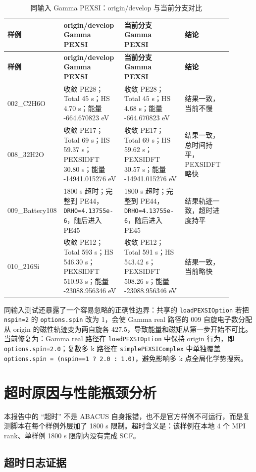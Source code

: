 \documentclass[a4paper,11pt]{article}
\newcommand{\code}[1]{\texttt{#1}}
\begin{document}
{\scriptsize
\begin{longtable}{@{}p{0.15\linewidth}p{0.27\linewidth}p{0.27\linewidth}p{0.21\linewidth}@{}}
\caption{同输入 Gamma PEXSI：origin/develop 与当前分支对比}
\label{tab:gamma-same-input-compare}\\
\toprule
\textbf{样例} & \textbf{origin/develop Gamma PEXSI} & \textbf{当前分支 Gamma PEXSI} & \textbf{结论}\\
\midrule
\endfirsthead
\toprule
\textbf{样例} & \textbf{origin/develop Gamma PEXSI} & \textbf{当前分支 Gamma PEXSI} & \textbf{结论}\\
\midrule
\endhead
002\_C2H6O & 收敛 PE28；Total 45 s；HS 4.70 s；能量 -664.670823 eV & 收敛 PE28；Total 45 s；HS 4.68 s；能量 -664.670823 eV & 结果一致，当前不慢\\
008\_32H2O & 收敛 PE17；Total 69 s；HS 59.37 s；PEXSIDFT 30.80 s；能量 -14941.015276 eV & 收敛 PE17；Total 69 s；HS 59.62 s；PEXSIDFT 30.57 s；能量 -14941.015276 eV & 结果一致，总时间持平，PEXSIDFT 略快\\
009\_Battery108 & 1800 s 超时；完整到 PE44，\code{DRHO=4.13755e-6}，随后进入 PE45 & 1800 s 超时；完整到 PE44，\code{DRHO=4.13755e-6}，随后进入 PE45 & 结果轨迹一致，超时进度持平\\
010\_216Si & 收敛 PE12；Total 593 s；HS 546.30 s；PEXSIDFT 510.93 s；能量 -23088.956346 eV & 收敛 PE12；Total 591 s；HS 543.42 s；PEXSIDFT 508.26 s；能量 -23088.956346 eV & 结果一致，当前略快\\
\bottomrule
\end{longtable}
}

同输入测试还暴露了一个容易忽略的正确性边界：共享的 \code{loadPEXSIOption} 若把 \code{nspin=2} 的 \code{options.spin} 改为 1，会使 Gamma real 路径的 009 自旋电子数分配从 origin 的磁性轨迹变为两自旋各 427.5，导致能量和磁矩从第一步开始不可比。当前修复为：Gamma real 路径在 \code{loadPEXSIOption} 中保持 origin 行为，即 \code{options.spin=2.0}；复数多 k 路径在 \code{simplePEXSIComplex} 中单独覆盖 \code{options.spin = (nspin==1 ? 2.0 : 1.0)}，避免影响多 k 点全局化学势搜索。

\section{超时原因与性能瓶颈分析}

本报告中的 ``超时'' 不是 ABACUS 自身报错，也不是官方样例不可运行，而是复测脚本在每个样例外层加了 1800 s 限制。超时含义是：该样例在本地 4 个 MPI rank、单样例 1800 s 限制内没有完成 SCF。

\subsection{超时日志证据}
\end{document}
